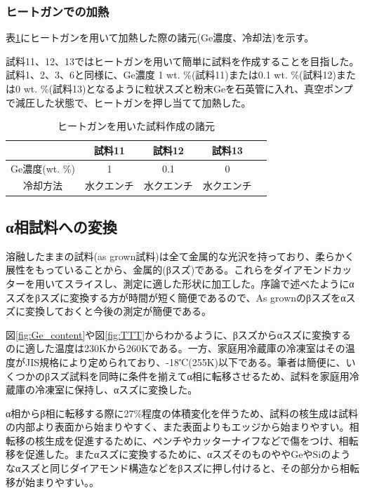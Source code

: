 \subsubsection{ヒートガンでの加熱}
表\ref{tab:sample_prep_heatgun}にヒートガンを用いて加熱した際の諸元(Ge濃度、冷却法)を示す。

試料11、12、13ではヒートガンを用いて簡単に試料を作成することを目指した。試料1、2、3、6と同様に、Ge濃度 1 wt. \%(試料11)または0.1 wt. \%(試料12)または0 wt. \%(試料13)となるように粒状スズと粉末Geを石英管に入れ、真空ポンプで減圧した状態で、ヒートガンを押し当てて加熱した。
\begin{table}[htb]
    \begin{center}
  \begin{tabular}{c|cccc}
    & 試料11 & 試料12 & 試料13 \\ \hline
    Ge濃度(wt. \%)  & 1 & 0.1 &  0  \\
    冷却方法 & 水クエンチ & 水クエンチ& 水クエンチ \\
  \end{tabular}
  \caption{ヒートガンを用いた試料作成の諸元}
  \label{tab:sample_prep_heatgun}
    \end{center}
\end{table}


\subsection{α相試料への変換}
溶融したままの試料(as grown試料)は全て金属的な光沢を持っており、柔らかく展性をもっていることから、金属的(βスズ)である。これらをダイアモンドカッターを用いてスライスし、測定に適した形状に加工した。序論で述べたようにαスズをβスズに変換する方が時間が短く簡便であるので、As grownのβスズをαスズに変換しておくと今後の測定が簡便である。

図\ref{fig:Ge_content}や図\ref{fig:TTT}からわかるように、βスズからαスズに変換するのに適した温度は230Kから260Kである\cite{Matvienko,Ogino,Cornelius}。一方、家庭用冷蔵庫の冷凍室はその温度がJIS規格により定められており、-18℃(255K)以下である。筆者は簡便に、いくつかのβスズ試料を同時に条件を揃えてα相に転移させるため、試料を家庭用冷蔵庫の冷凍室に保持し、αスズに変換した。

α相からβ相に転移する際に27\%程度の体積変化を伴うため、試料の核生成は試料の内部より表面から始まりやすく、また表面よりもエッジから始まりやすい\cite{Cornelius}。相転移の核生成を促進するために、ペンチやカッターナイフなどで傷をつけ、相転移を促進した。またαスズに変換するために、αスズそのものややGeやSiのようなαスズと同じダイアモンド構造などをβスズに押し付けると、その部分から相転移が始まりやすい。\cite{Cornelius}。

